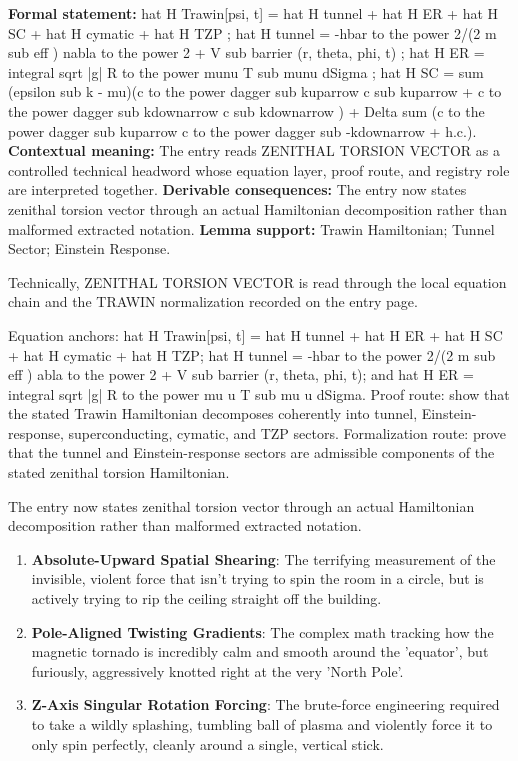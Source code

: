 \begingroup\footnotesize\setlength{\emergencystretch}{3em}\sloppy
\textbf{Formal statement:} hat H Trawin[psi, t] = hat H tunnel + hat H ER + hat H SC + hat H cymatic + hat H TZP ; hat H tunnel = -hbar to the power 2/(2 m sub eff ) nabla to the power 2 + V sub barrier (r, theta, phi, t) ; hat H ER = integral sqrt |g| R to the power munu T sub munu dSigma ; hat H SC = sum (epsilon sub k - mu)(c to the power dagger sub kuparrow c sub kuparrow + c to the power dagger sub kdownarrow c sub kdownarrow ) + Delta sum (c to the power dagger sub kuparrow c to the power dagger sub -kdownarrow + h.c.). \textbf{Contextual meaning:} The entry reads ZENITHAL TORSION VECTOR as a controlled technical headword whose equation layer, proof route, and registry role are interpreted together. \textbf{Derivable consequences:} The entry now states zenithal torsion vector through an actual Hamiltonian decomposition rather than malformed extracted notation. \textbf{Lemma support:} Trawin Hamiltonian; Tunnel Sector; Einstein Response.\par
\endgroup

Technically, ZENITHAL TORSION VECTOR is read through the local equation chain and the TRAWIN normalization recorded on the entry page.

Equation anchors: hat H Trawin[psi, t] = hat H tunnel + hat H ER + hat H SC + hat H cymatic + hat H TZP; hat H tunnel = -hbar to the power 2/(2 m sub eff ) abla to the power 2 + V sub barrier (r, theta, phi, t); and hat H ER = integral sqrt |g| R to the power mu u T sub mu u dSigma. Proof route: show that the stated Trawin Hamiltonian decomposes coherently into tunnel, Einstein-response, superconducting, cymatic, and TZP sectors. Formalization route: prove that the tunnel and Einstein-response sectors are admissible components of the stated zenithal torsion Hamiltonian.

The entry now states zenithal torsion vector through an actual Hamiltonian decomposition rather than malformed extracted notation.
\endgroup

\begin{enumerate}[leftmargin=1.6em,itemsep=6pt,topsep=4pt]
\item \textbf{Absolute-Upward Spatial Shearing}: The terrifying measurement of the invisible, violent force that isn't trying to spin the room in a circle, but is actively trying to rip the ceiling straight off the building.
\item \textbf{Pole-Aligned Twisting Gradients}: The complex math tracking how the magnetic tornado is incredibly calm and smooth around the 'equator', but furiously, aggressively knotted right at the very 'North Pole'.
\item \textbf{Z-Axis Singular Rotation Forcing}: The brute-force engineering required to take a wildly splashing, tumbling ball of plasma and violently force it to only spin perfectly, cleanly around a single, vertical stick.
\end{enumerate}

